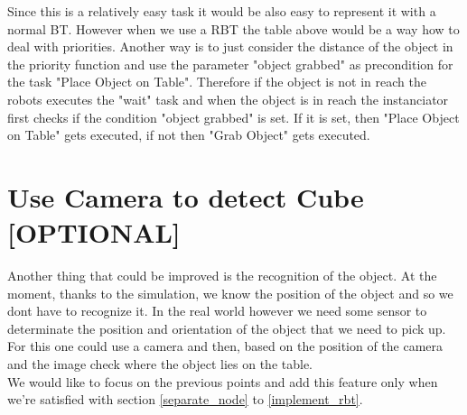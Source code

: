 \documentclass[report]{iisthesis}
\begin{document}
Since this is a relatively easy task it would be also easy to represent it with a normal BT. However when we use a RBT the table above would be a way how to deal with priorities. Another way is to just consider the distance of the object in the priority function and use the parameter "object grabbed" as precondition for the task "Place Object on Table".
Therefore if the object is not in reach the robots executes the "wait" task and when the object is in reach the instanciator first checks if the condition "object grabbed" is set. If it is set, then "Place Object on Table" gets executed, if not then "Grab Object" gets executed.

\section{Use Camera to detect Cube [OPTIONAL]}
\label{use_camera}
Another thing that could be improved is the recognition of the object. At the moment, thanks to the simulation, we know the position of the object and so we dont have to recognize it. In the real world however we need some sensor to determinate the position and orientation of the object that we need to pick up. For this one could use a camera and then, based on the position of the camera and the image check where the object lies on the table. \\
We would like to focus on the previous points and add this feature only when we're satisfied with section \ref{separate_node} to \ref{implement_rbt}. 
\end{document}
